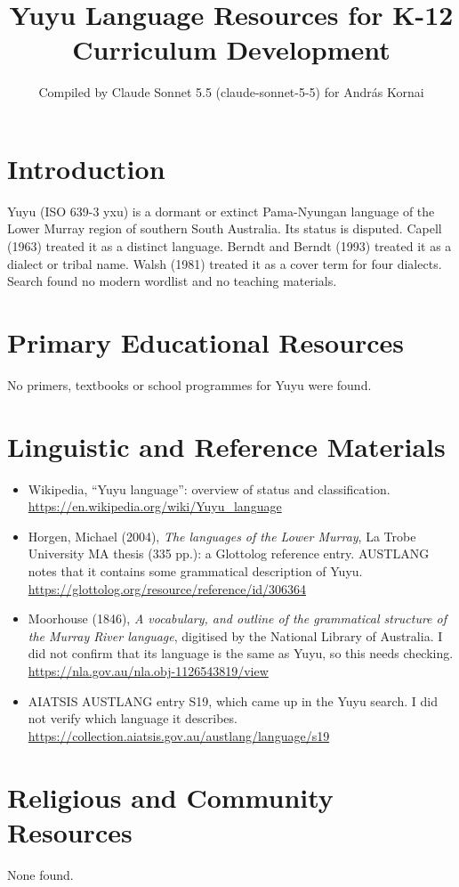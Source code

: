 \documentclass[12pt]{article}
\title{Yuyu Language Resources for K-12 Curriculum Development}
\author{Compiled by Claude Sonnet 5.5 (claude-sonnet-5-5) for Andr\'as Kornai}
\date{}
\begin{document}
\maketitle

\section{Introduction}
Yuyu (ISO 639-3 yxu) is a dormant or extinct Pama-Nyungan language of the Lower Murray region of southern South Australia. Its status is disputed. Capell (1963) treated it as a distinct language. Berndt and Berndt (1993) treated it as a dialect or tribal name. Walsh (1981) treated it as a cover term for four dialects. Search found no modern wordlist and no teaching materials.

\section{Primary Educational Resources}
No primers, textbooks or school programmes for Yuyu were found.

\section{Linguistic and Reference Materials}
\begin{itemize}
\item Wikipedia, ``Yuyu language'': overview of status and classification. \url{https://en.wikipedia.org/wiki/Yuyu_language}
\item Horgen, Michael (2004), \emph{The languages of the Lower Murray}, La Trobe University MA thesis (335 pp.): a Glottolog reference entry. AUSTLANG notes that it contains some grammatical description of Yuyu. \url{https://glottolog.org/resource/reference/id/306364}
\item Moorhouse (1846), \emph{A vocabulary, and outline of the grammatical structure of the Murray River language}, digitised by the National Library of Australia. I did not confirm that its language is the same as Yuyu, so this needs checking. \url{https://nla.gov.au/nla.obj-1126543819/view}
\item AIATSIS AUSTLANG entry S19, which came up in the Yuyu search. I did not verify which language it describes. \url{https://collection.aiatsis.gov.au/austlang/language/s19}
\end{itemize}

\section{Religious and Community Resources}
None found.
\end{document}
